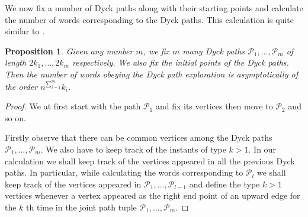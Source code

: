 \documentclass[12pt]{article}
\numberwithin{equation}{section}
\newtheorem{proposition}{Proposition}[section]
\numberwithin{equation}{section}
\theoremstyle{definition}
\renewcommand{\1}{\bf 1}
\begin{document}
We now fix a number of Dyck paths along with their starting points and calculate the number of words corresponding to the Dyck paths. This calculation is quite similar to \citet{peche2009universality}.
\begin{proposition}\label{lem:countingstrategy}
Given any number $m$, we fix $m$ many Dyck paths $\mathcal{P}_{1},\ldots, \mathcal{P}_{m}$ of length $2k_{1},\ldots, 2k_{m}$ respectively. We also fix the initial points of the Dyck paths. Then the number of words obeying the Dyck path exploration is asymptotically of the order $n^{\sum_{i=1}^{m}}k_{i}$.
\end{proposition}
\begin{proof}
We at first start with the path $\mathcal{P}_{1}$ and fix its vertices then move to $\mathcal{P}_{2}$ and so on.

\noindent
Firstly observe that there can be common vertices among the Dyck paths $\mathcal{P}_{1},\ldots, \mathcal{P}_{m}$. We also have to keep track of the instants of type $k>1$. In our calculation we shall keep track of the vertices appeared in all the previous Dyck paths. In particular, while calculating the words corresponding to $\mathcal{P}_{l}$ we shall keep track of the vertices appeared in $\mathcal{P}_{1},\ldots, \mathcal{P}_{l-1}$ and define the type $k>1$ vertices whenever a vertex appeared as the right end point of an upward edge for the $k$ th time in the joint path tuple $\mathcal{P}_{1},\ldots, \mathcal{P}_{m}$. 


\end{proof}
\end{document}

